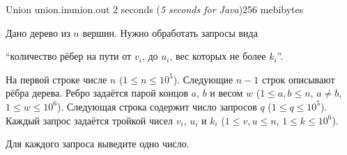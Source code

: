\begin{problem}{Union}
{union.in}{union.out}
{2 seconds (\textsl{5 seconds for Java})}{256 mebibytes}{}


Дано дерево из $n$ вершин. Нужно обработать запросы вида 

``количество рёбер на пути от $v_i$, до $u_i$, вес которых не более $k_i$''.

\InputFile

На первой строке числе $n$ ($1 \le n \le 10^5$).
Следующие $n - 1$ строк описывают рёбра дерева.
Ребро задаётся парой концов $a$, $b$ и весом $w$ ($1 \le a, b \le n$, $a \ne b$, $1 \le w \le 10^6$).
Следующая строка содержит число запросов $q$ ($1 \le q \le 10^5$).
Каждый запрос задаётся тройкой чисел $v_i$, $u_i$ и $k_i$
($1 \le v, u \le n$, $1 \le k \le 10^6$).

\OutputFile

Для каждого запроса выведите одно число.

\Examples

\begin{example}
%
%
\end{example}




\end{problem}
